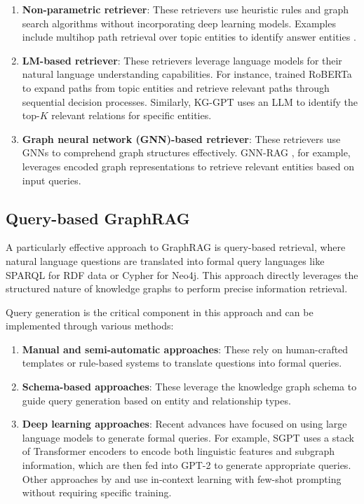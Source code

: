 \begin{enumerate}
    \item \textbf{Non-parametric retriever}: These retrievers use heuristic rules and graph search algorithms without incorporating deep learning models. Examples include multihop path retrieval over topic entities to identify answer entities \citep{yasunaga-etal-2021-qa,grapeqa}.
    
    \item \textbf{LM-based retriever}: These retrievers leverage language models for their natural language understanding capabilities. For instance, \cite{Zhang_2022} trained RoBERTa \citep{liu2019robertarobustlyoptimizedbert} to expand paths from topic entities and retrieve relevant paths through sequential decision processes. Similarly, KG-GPT \citep{kim-etal-2023-kg} uses an LLM to identify the top-$K$ relevant relations for specific entities.
    
    \item \textbf{Graph neural network (GNN)-based retriever}: These retrievers use GNNs to comprehend graph structures effectively. GNN-RAG \citep{mavromatis2024gnnraggraphneuralretrieval}, for example, leverages encoded graph representations to retrieve relevant entities based on input queries.
\end{enumerate}

\subsection{Query-based GraphRAG}
A particularly effective approach to GraphRAG is query-based retrieval, where natural language questions are translated into formal query languages like SPARQL for RDF data or Cypher for Neo4j. This approach directly leverages the structured nature of knowledge graphs to perform precise information retrieval.

Query generation is the critical component in this approach and can be implemented through various methods:

\begin{enumerate}
    \item \textbf{Manual and semi-automatic approaches}: These rely on human-crafted templates or rule-based systems to translate questions into formal queries.
    
    \item \textbf{Schema-based approaches}: These leverage the knowledge graph schema to guide query generation based on entity and relationship types.
    
    \item \textbf{Deep learning approaches}: Recent advances have focused on using large language models to generate formal queries. For example, SGPT \citep{ronysgpt} uses a stack of Transformer encoders to encode both linguistic features and subgraph information, which are then fed into GPT-2 \citep{radford2019language} to generate appropriate queries. Other approaches by \cite{emonet2024llmbasedsparqlquerygeneration} and \cite{Kovriguina2023SPARQLGENOP} use in-context learning with few-shot prompting without requiring specific training.
\end{enumerate}

